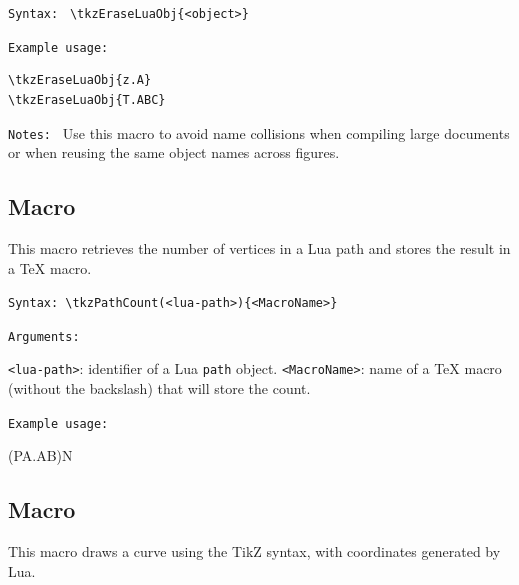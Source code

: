\texttt{Syntax: } \verb|\tkzEraseLuaObj{<object>}|

\texttt{Example usage: }

\begin{mybox}
\begin{verbatim}
\tkzEraseLuaObj{z.A}
\tkzEraseLuaObj{T.ABC}
\end{verbatim}
\end{mybox}


\texttt{Notes: }
Use this macro to avoid name collisions when compiling large documents
or when reusing the same object names across figures.



\subsection{Macro }
This macro retrieves the number of vertices in a Lua path and stores the result in a TeX macro.

\texttt{Syntax: }\verb|\tkzPathCount(<lua-path>){<MacroName>}|

\texttt{Arguments: }

\verb|<lua-path>|: identifier of a Lua \verb|path| object.
\verb|<MacroName>|: name of a TeX macro (without the backslash) that will store the count.


\texttt{Example usage: }

\begin{tkzexample}[latex=.5\textwidth]
\tkzPathCount(PA.AB){N}
\begin{center}
\end{center}
\end{tkzexample}



\subsection{Macro }
This macro draws a curve using the TikZ  syntax, with coordinates generated by Lua.

